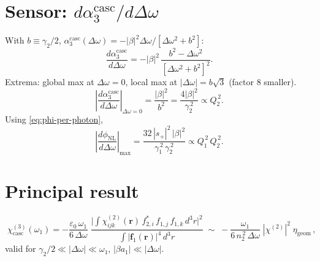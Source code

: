 \documentclass[11pt,a4paper]{article}
\newcommand{\eps}{\varepsilon}
\newcommand{\bvec}[1]{\mathbf{#1}}
\newcommand{\f}{\bvec{f}}
\newcommand{\ri}{\bvec{r}}
\newcommand{\dthreer}{\,d^{3}r}
\newcommand{\chitwo}{\chi^{(2)}}
\newcommand{\chithree}{\chi^{(3)}}
\newcommand{\Dom}{\Delta\omega}
\begin{document}
\section{Sensor: $d\alpha_3^\text{casc}/d\Dom$}

With $b\equiv\gamma_2/2$, $\alpha_3^\text{casc}(\Dom)=-|\beta|^{2}\Dom/[\Dom^{2}+b^{2}]$:
\begin{equation}
  \frac{d\alpha_3^\text{casc}}{d\Dom}=-|\beta|^{2}\,
        \frac{b^{2}-\Dom^{2}}{[\Dom^{2}+b^{2}]^{2}}.
\end{equation}
Extrema: global max at $\Dom=0$, local max at $|\Dom|=b\sqrt{3}$ (factor 8 smaller).
\begin{equation}
  \boxed{\;\left|\frac{d\alpha_3^\text{casc}}{d\Dom}\right|_{\Dom=0}
     =\frac{|\beta|^{2}}{b^{2}}=\frac{4|\beta|^{2}}{\gamma_2^{\,2}}\propto Q_2^{\,2}.\;}
\end{equation}
Using \eqref{eq:phi-per-photon},
\begin{equation}
   \left|\frac{d\phi_\text{NL}}{d\Dom}\right|_\text{max}
     =\frac{32\,|s_+|^{2}\,|\beta|^{2}}{\gamma_1^{\,2}\,\gamma_2^{\,2}}
     \propto Q_1^{\,2}\,Q_2^{\,2}.
\end{equation}

\section{Principal result}

\begin{equation}
  \boxed{\;\chithree_\text{casc}(\omega_1)
        =-\frac{\eps_0\,\omega_1}{6\,\Dom}\;
          \frac{\bigl|\!\int\!\chitwo_{ijk}(\ri)\,f_{2,i}^*\,f_{1,j}\,f_{1,k}\dthreer\bigr|^{2}}
               {\int|\f_1(\ri)|^{4}\dthreer}
        \;\sim\;-\frac{\omega_1}{6\,n_2^{\,2}\,\Dom}\;|\chitwo|^{2}\;\eta_\text{geom}\,,\;}
\end{equation}
valid for $\gamma_2/2\ll|\Dom|\ll\omega_1$, $|\beta a_1|\ll|\Dom|$.
\end{document}
